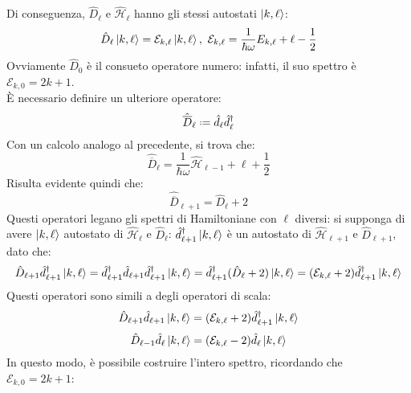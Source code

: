 Di conseguenza, $ \hat{D}_{\ell} $ e $ \hat{\mathcal{H}}_{\ell} $ hanno gli stessi autostati $ \ket{k,\ell} $:
\begin{equation}
	\hat{D}_{\ell} \ket{k,\ell} = \mathcal{E}_{k,\ell} \ket{k,\ell}, \,\, \mathcal{E}_{k,\ell} = \frac{1}{\hbar \omega} E_{k,\ell} + \ell - \frac{1}{2}
	\label{eq:3.31}
\end{equation}
Ovviamente $ \hat{D}_0 $ è il consueto operatore numero: infatti, il suo spettro è $ \mathcal{E}_{k,0} = 2k + 1 $.\\
È necessario definire un ulteriore operatore:
\begin{equation}
	\hat{\overline{D}}_{\ell} \defeq \hat{d}_{\ell} \hat{d}_{\ell}^{\dagger}
	\label{eq:3.32}
\end{equation}
Con un calcolo analogo al precedente, si trova che:
\begin{equation}
	\hat{\overline{D}}_{\ell} = \frac{1}{\hbar \omega} \hat{\mathcal{H}}_{\ell - 1} + \ell + \frac{1}{2}
	\label{eq:3.33}
\end{equation}
Risulta evidente quindi che:
\begin{equation}
	\hat{\overline{D}}_{\ell + 1} = \hat{D}_{\ell} + 2
	\label{eq:3.34}
\end{equation}
Questi operatori legano gli spettri di Hamiltoniane con $ \ell $ diversi: si supponga di avere $ \ket{k,\ell} $ autostato di $ \hat{\mathcal{H}}_{\ell} $ e $ \hat{D}_{\ell} $: $ \hat{d}_{\ell + 1}^{\dagger} \ket{k,\ell} $ è un autostato di $ \hat{\mathcal{H}}_{\ell + 1} $ e $ \hat{D}_{\ell + 1} $, dato che:
\begin{equation*}
	\hat{D}_{\ell + 1} \hat{d}_{\ell + 1}^{\dagger} \ket{k,\ell} = \hat{d}_{\ell + 1}^{\dagger} \hat{d}_{\ell + 1} \hat{d}_{\ell + 1}^{\dagger} \ket{k,\ell} = \hat{d}_{\ell + 1}^{\dagger} (\hat{D}_{\ell} + 2) \ket{k,\ell} = (\mathcal{E}_{k,\ell} + 2) \hat{d}_{\ell + 1}^{\dagger} \ket{k,\ell}
\end{equation*}
Questi operatori sono simili a degli operatori di scala:
\begin{equation}
	\hat{D}_{\ell + 1} \hat{d}_{\ell + 1} \ket{k,\ell} = (\mathcal{E}_{k,\ell} + 2) \hat{d}_{\ell + 1}^{\dagger} \ket{k,\ell}
	\label{eq:3.35}
\end{equation}
\begin{equation}
	\hat{D}_{\ell - 1} \hat{d}_{\ell} \ket{k,\ell} = (\mathcal{E}_{k,\ell} - 2) \hat{d}_{\ell} \ket{k,\ell}
	\label{eq:3.36}
\end{equation}
In questo modo, è possibile costruire l'intero spettro, ricordando che $ \mathcal{E}_{k,0} = 2k + 1 $:

